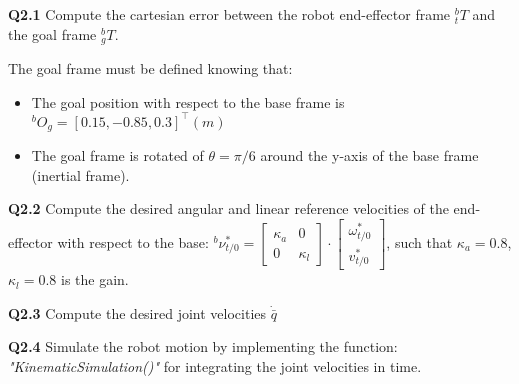 \textbf{Q2.1} Compute the cartesian error between the robot end-effector frame $^b_t T$ and the goal frame $^b_{g} T$.

The goal frame  must be defined knowing that:
\begin{itemize}
    \item The goal position with respect to the base frame is $^b O_g = [0.15, -0.85, 0.3]^\top(m)$
    \item The goal frame is rotated of $\theta = \pi/6$ around the y-axis of the base frame (inertial frame).
\end{itemize}

\textbf{Q2.2}
Compute the desired angular and linear reference velocities of the end-effector  with respect to the base: $^b \nu^*_{t/0} = \begin{bmatrix}
    \kappa_a &0\\
    0 &\kappa_l
\end{bmatrix}\cdot \begin{bmatrix} \omega^*_{t/0} \\  v^*_{t/0} \end{bmatrix}$, such that $\kappa_{a} = 0.8$,$\kappa_{l} = 0.8$ is the gain.
    
\textbf{Q2.3}
Compute the desired joint velocities $\dot{\bar{q}}$

\textbf{Q2.4}
Simulate the robot motion by implementing the function: \textit{"KinematicSimulation()"} for integrating the joint velocities in time.